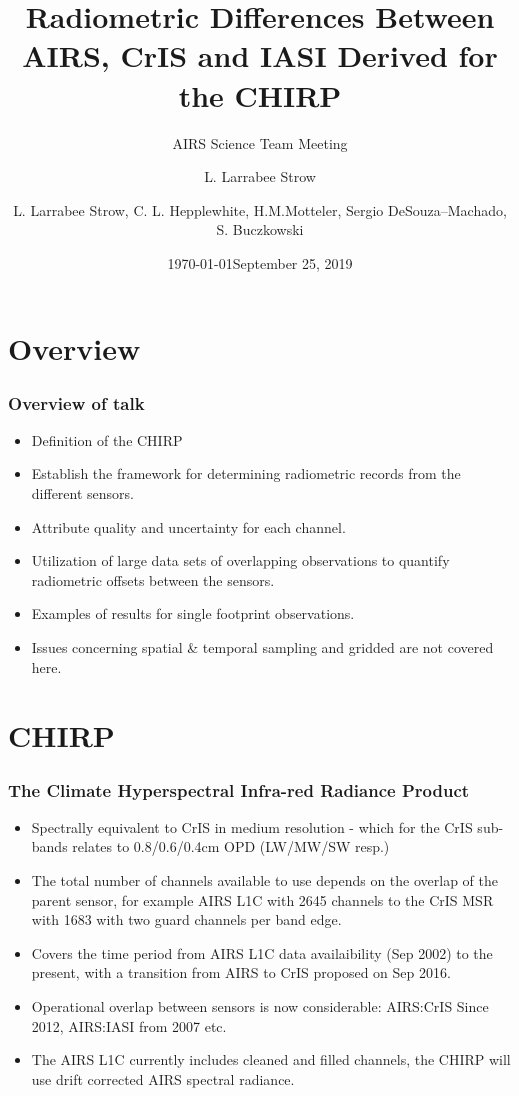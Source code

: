 \documentclass[10pt,t]{beamer}
\author{L. Larrabee Strow}
\date{\today}
\title{\large Radiometric Differences Between \newline
 AIRS, CrIS and IASI Derived for the  \newline
  CHIRP}
\subtitle{\footnotesize{AIRS Science Team Meeting}}
\date{\vspace{0.1in}\footnotesize{September 25, 2019 \vfill}}
\author{L. Larrabee Strow\inst{1,2}, C. L. Hepplewhite\inst{1,2}, H.M.Motteler\inst{1,2}, Sergio DeSouza--Machado\inst{1,2}, S. Buczkowski\inst{1,2}}
\institute[UMBC]{\inst{1} UMBC Physics Dept. \and \inst{2}UMBC JCET}
\begin{document}
\maketitle
{}

\section{Overview}
\begin{frame}
  \frametitle{Overview of talk}
  \begin{itemize}
  \item Definition of the CHIRP
  \item Establish the framework for determining radiometric records from the different sensors.
  \item Attribute quality and uncertainty for each channel.
  \item Utilization of large data sets of overlapping observations to quantify radiometric offsets between the sensors.
  \item Examples of results for single footprint observations.
  \item Issues concerning spatial \& temporal sampling and gridded are not covered here.
    
  \end{itemize}
\end{frame}

\section{CHIRP}
\begin{frame}
  \frametitle{The Climate Hyperspectral Infra-red Radiance Product}
  \begin{itemize}
  \item Spectrally equivalent to CrIS in medium resolution - which for the CrIS sub-bands relates to 0.8/0.6/0.4cm OPD (LW/MW/SW resp.)
  \item The total number of channels available to use depends on the overlap of the parent sensor, for example AIRS L1C with 2645 channels to the CrIS MSR with 1683 with two guard channels per band edge.
  \item Covers the time period from AIRS L1C data availaibility (Sep 2002) to the present, with a transition from AIRS to CrIS proposed on Sep 2016.
  \item Operational overlap between sensors is now considerable: AIRS:CrIS Since 2012, AIRS:IASI from 2007 etc.
  \item The AIRS L1C currently includes cleaned and filled channels, the CHIRP will use drift corrected AIRS spectral radiance.
    
  \end{itemize}
\end{frame}
\end{document}
